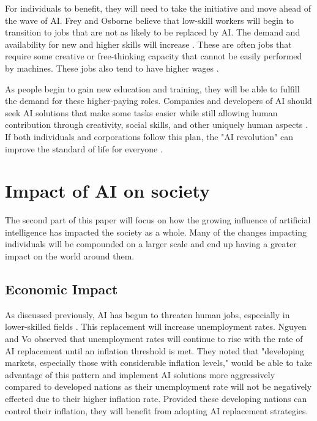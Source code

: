 \documentclass[12pt, man]{apa6}
\begin{document}
For individuals to benefit, they will need to take the initiative and move ahead of the wave of AI.  Frey and Osborne \parencite*[]{Frey2017} believe that low-skill workers will begin to transition to jobs that are not as likely to be replaced by AI. The demand and availability for new and higher skills will increase \parencite{Willcocks2020}.  These are often jobs that require some creative or free-thinking capacity that cannot be easily performed by machines.  These jobs also tend to have higher wages \parencite{Frey2017}.

As people begin to gain new education and training, they will be able to fulfill the demand for these higher-paying roles.  Companies and developers of AI should seek AI solutions that make some tasks easier while still allowing human contribution through creativity, social skills, and other uniquely human aspects \parencite[]{Kolade2022}.  If both individuals and corporations follow this plan, the "AI revolution" can improve the standard of life for everyone \parencite{Makridakis2017}.

\section*{Impact of AI on society}
The second part of this paper will focus on how the growing influence of artificial intelligence has impacted the society as a whole.  Many of the changes impacting individuals will be compounded on a larger scale and end up having a greater impact on the world around them.

\subsection*{Economic Impact}
As discussed previously, AI has begun to threaten human jobs, especially in lower-skilled fields \parencite{Huang2018}.  This replacement will increase unemployment rates.  Nguyen and Vo \parencite*{Nguyen2022} observed that unemployment rates will continue to rise with the rate of AI replacement until an inflation threshold is met.  They noted that "developing markets, especially those with considerable inflation levels," would be able to take advantage of this pattern and implement AI solutions more aggressively compared to developed nations as their unemployment rate will not be negatively effected due to their higher inflation rate.  Provided these developing nations can control their inflation, they will benefit from adopting AI replacement strategies.
\end{document}

